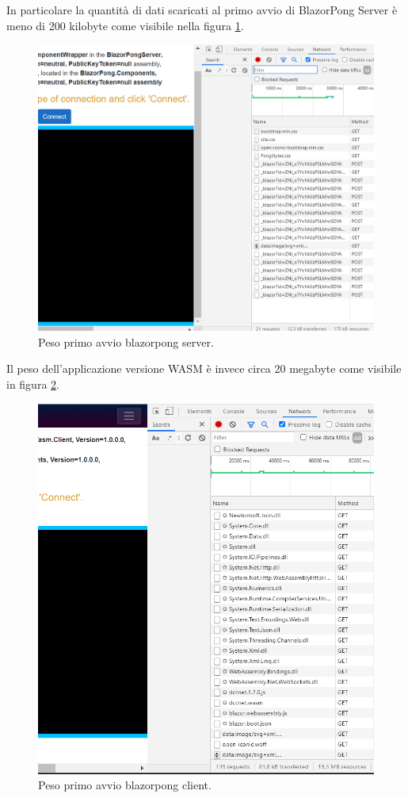 In particolare la quantit\`a di dati scaricati al primo avvio di BlazorPong Server \`e meno di 200 kilobyte come visibile nella figura \ref{fig:blazorpongServerWeigth}.

\begin{figure}[H]
	\centerline{\includegraphics[scale=0.5]{figure/blazorpongServerWeigth.PNG}}
	\caption{Peso primo avvio blazorpong server.}
	\label{fig:blazorpongServerWeigth}
\end{figure}

Il peso dell'applicazione versione WASM \`e invece circa 20 megabyte come visibile in figura \ref{fig:blazorpongClientWeigth}.

\begin{figure}[H]
	\centerline{\includegraphics[scale=0.5]{figure/blazorpongClientWeigth.PNG}}
	\caption{Peso primo avvio blazorpong client.}
	\label{fig:blazorpongClientWeigth}
\end{figure}